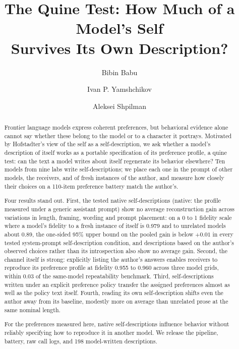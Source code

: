 \documentclass[11pt]{article}
\title{\textbf{The Quine Test: How Much of a Model's Self\\Survives Its Own
Description?}}
\author[1]{Bibin Babu}
\author[1]{Ivan P. Yamshchikov}
\author[2]{Aleksei Shpilman}
\affil[1]{Technical University of Applied Sciences W\"urzburg-Schweinfurt (THWS)\\
  \texttt{\{bibin.babu, ivan.yamshchikov\}@thws.de}}
\affil[2]{Sirius University \quad \texttt{a@shpilman.ai}}
\date{}
\begin{document}
\maketitle

\begin{abstract}
Frontier language models express coherent preferences, but behavioral evidence
alone cannot say whether these belong to the model or to a character it
portrays. Motivated by Hofstadter's view of the self as a self-description, we
ask whether a model's description of itself works as a portable specification
of its preference profile, a quine test: can the text a model writes about
itself regenerate its behavior elsewhere? Ten models from nine labs write
self-descriptions; we place each one in the prompt of other models, the
receivers, and of fresh instances of the author, and measure how closely their choices on a
110-item preference battery match the author's.

Four results stand out. First, the tested native self-descriptions (native:
the profile measured under a generic assistant prompt) show no average
reconstruction gain across variations in length, framing, wording and
prompt placement: on a 0 to 1 fidelity scale where a model's fidelity to a fresh instance
of itself is 0.979 and to unrelated models about 0.89, the one-sided 95\% upper
bound on the pooled gain is below $+0.01$ in every tested system-prompt
self-description condition, and descriptions based on the author's observed
choices rather than its introspection also show no average gain. Second,
the channel itself is strong: explicitly listing the author's answers
enables receivers to reproduce its preference profile at fidelity 0.955 to
0.960 across three model grids, within 0.03 of the same-model repeatability
benchmark. Third, self-descriptions written under an explicit preference
policy transfer the assigned preferences almost as well as the policy text
itself. Fourth, reading its own self-description shifts even
the author away from its baseline, modestly more on average than unrelated
prose at the same nominal length.

For the preferences measured here, native self-descriptions influence
behavior without reliably specifying how to reproduce it in another model. We release
the pipeline, battery, raw call logs, and 198 model-written descriptions.
\end{abstract}
\end{document}
